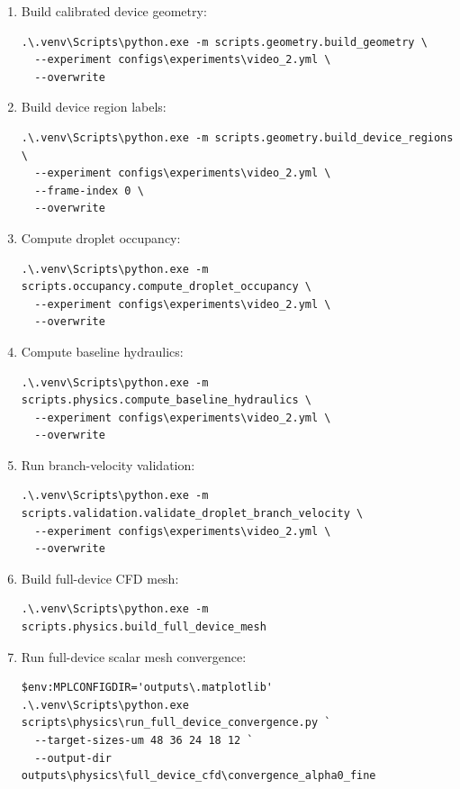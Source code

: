 \begin{enumerate}[label=\arabic*.]
  \item Build calibrated device geometry:
\begin{verbatim}
.\.venv\Scripts\python.exe -m scripts.geometry.build_geometry \
  --experiment configs\experiments\video_2.yml \
  --overwrite
\end{verbatim}

  \item Build device region labels:
\begin{verbatim}
.\.venv\Scripts\python.exe -m scripts.geometry.build_device_regions \
  --experiment configs\experiments\video_2.yml \
  --frame-index 0 \
  --overwrite
\end{verbatim}

  \item Compute droplet occupancy:
\begin{verbatim}
.\.venv\Scripts\python.exe -m scripts.occupancy.compute_droplet_occupancy \
  --experiment configs\experiments\video_2.yml \
  --overwrite
\end{verbatim}

  \item Compute baseline hydraulics:
\begin{verbatim}
.\.venv\Scripts\python.exe -m scripts.physics.compute_baseline_hydraulics \
  --experiment configs\experiments\video_2.yml \
  --overwrite
\end{verbatim}

  \item Run branch-velocity validation:
\begin{verbatim}
.\.venv\Scripts\python.exe -m scripts.validation.validate_droplet_branch_velocity \
  --experiment configs\experiments\video_2.yml \
  --overwrite
\end{verbatim}

  \item Build full-device CFD mesh:
\begin{verbatim}
.\.venv\Scripts\python.exe -m scripts.physics.build_full_device_mesh
\end{verbatim}

  \item Run full-device scalar mesh convergence:
\begin{verbatim}
$env:MPLCONFIGDIR='outputs\.matplotlib'
.\.venv\Scripts\python.exe scripts\physics\run_full_device_convergence.py `
  --target-sizes-um 48 36 24 18 12 `
  --output-dir outputs\physics\full_device_cfd\convergence_alpha0_fine
\end{verbatim}


\end{enumerate}
